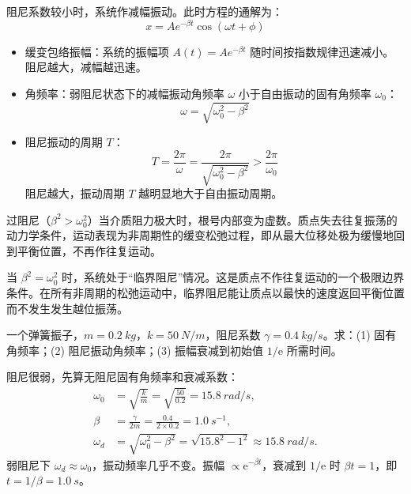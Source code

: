 \documentclass[lang=cn,11pt]{elegantbook}
\begin{document}
\begin{definition}[弱阻尼]
阻尼系数较小时，系统作减幅振动。此时方程的通解为：$$\boxed{x = A e^{-\beta t} \cos(\omega t + \phi)}$$
    \begin{itemize}
    \item 缓变包络振幅：系统的振幅项 $A(t) = A e^{-\beta t}$ 随时间按指数规律迅速减小。阻尼越大，减幅越迅速。
    \item 角频率：弱阻尼状态下的减幅振动角频率 $\omega$ 小于自由振动的固有角频率 $\omega_0$：$$\omega = \sqrt{\omega_0^2 - \beta^2}$$
    \item 阻尼振动的周期 $T$：$$T = \frac{2\pi}{\omega} = \frac{2\pi}{\sqrt{\omega_0^2 - \beta^2}} > \frac{2\pi}{\omega_0}$$阻尼越大，振动周期 $T$ 越明显地大于自由振动周期。
    \end{itemize}
\end{definition}
\begin{definition}[强阻尼]
过阻尼（$\beta^2 > \omega_0^2$）当介质阻力极大时，根号内部变为虚数。质点失去往复振荡的动力学条件，运动表现为非周期性的缓变松弛过程，即从最大位移处极为缓慢地回到平衡位置，不再作往复运动。
\end{definition}
\begin{definition}[临界阻尼]
当 $\beta^2 = \omega_0^2$ 时，系统处于“临界阻尼”情况。这是质点不作往复运动的一个极限边界条件。在所有非周期的松弛运动中，临界阻尼能让质点以最快的速度返回平衡位置而不发生发生越位振荡。
\end{definition}


\begin{exercise}
一个弹簧振子，\(m=\SI{0.2}{kg}\)，\(k=\SI{50}{N/m}\)，阻尼系数 \(\gamma=\SI{0.4}{kg/s}\)。求：(1) 固有角频率；(2) 阻尼振动角频率；(3) 振幅衰减到初始值 \(1/\mathrm{e}\) 所需时间。
\end{exercise}
\begin{solution}
阻尼很弱，先算无阻尼固有角频率和衰减系数：
\[
\begin{aligned}
\omega_0&=\sqrt{\frac{k}{m}}=\sqrt{\frac{50}{0.2}}=\SI{15.8}{rad/s},\\
\beta&=\frac{\gamma}{2m}=\frac{0.4}{2\times0.2}=\SI{1.0}{s^{-1}},\\
\omega_d&=\sqrt{\omega_0^2-\beta^2}
=\sqrt{15.8^2-1^2}\approx\SI{15.8}{rad/s}.
\end{aligned}
\]
弱阻尼下 \(\omega_d\approx\omega_0\)，振动频率几乎不变。振幅 \(\propto\mathrm{e}^{-\beta t}\)，衰减到 \(1/\mathrm{e}\) 时 \(\beta t=1\)，即 \(t=1/\beta=\SI{1.0}{s}\)。
\end{solution}
\end{document}
